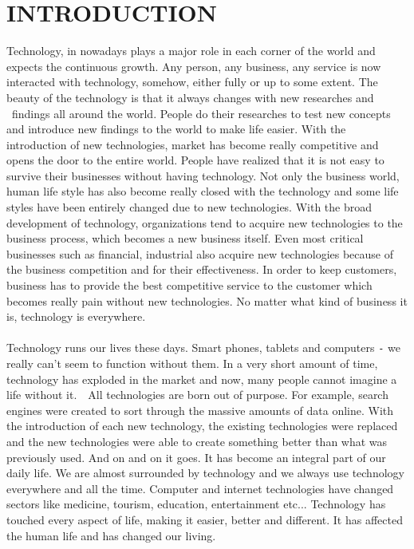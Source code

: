 \section{INTRODUCTION}
Technology, in nowadays plays a major role in each corner of the world and expects the continuous growth. Any person, any business, any service is now interacted with technology, somehow, either fully or up to some extent. The beauty of the technology is that it always changes with new researches and  findings all around the world. People do their researches to test new concepts and introduce new findings to the world to make life easier. With the  introduction of new technologies, market has become really competitive and opens the door to the entire world. People have realized that it is not easy to survive their businesses without having technology. Not only the business world, human life style has also become really closed with the technology and some life styles have been entirely changed due to new technologies. With the broad development of technology, organizations tend to acquire new technologies to the business process, which becomes a new business itself. Even most critical businesses such as financial, industrial also acquire new technologies because of the business competition and for their effectiveness. In order to keep customers, business has to provide the best competitive service to the customer which becomes really pain without new technologies. No matter what kind of business it is, technology is everywhere. 

\paragraph{}
Technology runs our lives these days. Smart phones, tablets and computers \verb|-| we really can't seem to function without them. In a very short amount of time, technology has exploded in the market and now, many people cannot imagine a life without it.  All technologies are born out of purpose. For example, search engines were created to sort through the massive amounts of data online. With the introduction of each new technology, the existing technologies were replaced and the new technologies were able to create something better than what was previously used. And on and on it goes. It has become an integral part of our daily life. We are almost surrounded by technology and we always use technology everywhere and all the time. Computer and internet technologies have changed sectors like medicine, tourism, education, entertainment etc... Technology has touched every aspect of life, making it easier, better and different. It has affected the human life and has changed our living.\cite{technology}

